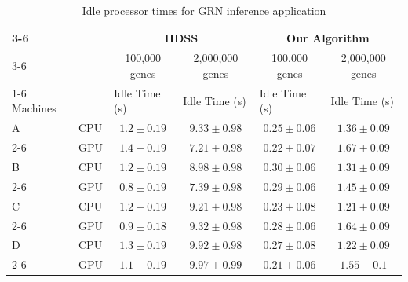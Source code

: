 \documentclass[journal]{IEEEtran}
\begin{document}
\begin{table}[htb]
\centering
\caption{Idle processor times for GRN inference application}
\begin{scriptsize}
\begin{tabular}{|l|l|l|l|l|l|}
\cline{3-6}
\multicolumn{1}{l}{} &  & \multicolumn{2}{c|}{HDSS} & \multicolumn{2}{c|}{Our Algorithm} \\ 
\cline{3-6}
\multicolumn{1}{l}{} &  & \multicolumn{1}{c|}{100,000 genes} & \multicolumn{1}{c|}{2,000,000 genes} & \multicolumn{1}{c|}{100,000 genes} & \multicolumn{1}{c|}{2,000,000 genes} \\ 
\cline{1-6}
\multicolumn{1}{|c}{} Machines &  & Idle Time (s) & Idle Time (s) & Idle Time (s) & Idle Time (s) \\ 
\hline
A & CPU & \multicolumn{1}{c|}{$1.2 \pm 0.19$} & \multicolumn{1}{c|}{$9.33 \pm 0.98$} & \multicolumn{1}{c|}{$0.25 \pm 0.06$} & \multicolumn{1}{c|}{$1.36 \pm 0.09$} \\ 
\cline{2-6}
 & GPU & \multicolumn{1}{c|}{$1.4 \pm 0.19$} & \multicolumn{1}{c|}{$7.21 \pm 0.98$} & \multicolumn{1}{c|}{$0.22 \pm 0.07$} & \multicolumn{1}{c|}{$1.67 \pm 0.09$} \\ 
\hline
B & CPU & \multicolumn{1}{c|}{$1.2 \pm 0.19$} & \multicolumn{1}{c|}{$8.98 \pm 0.98$} & \multicolumn{1}{c|}{$0.30 \pm 0.06$} & \multicolumn{1}{c|}{$1.31 \pm 0.09$} \\ 
\cline{2-6}
 & GPU & \multicolumn{1}{c|}{$0.8 \pm 0.19$} & \multicolumn{1}{c|}{$7.39 \pm 0.98$} & \multicolumn{1}{c|}{$0.29 \pm 0.06$} & \multicolumn{1}{c|}{$1.45 \pm 0.09$} \\ 
\hline
C & CPU & \multicolumn{1}{c|}{$1.2 \pm 0.19$} & \multicolumn{1}{c|}{$9.21 \pm 0.98$} & \multicolumn{1}{c|}{$0.23 \pm 0.08$} & \multicolumn{1}{c|}{$1.21 \pm 0.09$} \\ 
\cline{2-6}
 & GPU & \multicolumn{1}{c|}{$0.9 \pm 0.18$} & \multicolumn{1}{c|}{$9.32 \pm 0.98$} & \multicolumn{1}{c|}{$0.28 \pm 0.06$} & \multicolumn{1}{c|}{$1.64 \pm 0.09$} \\ 
\hline
D & CPU & \multicolumn{1}{c|}{$1.3 \pm 0.19$} & \multicolumn{1}{c|}{$9.92 \pm 0.98$} & \multicolumn{1}{c|}{$0.27 \pm 0.08$} & \multicolumn{1}{c|}{$1.22 \pm 0.09$} \\ 
\cline{2-6}
 & GPU & \multicolumn{1}{c|}{$1.1 \pm 0.19$} & \multicolumn{1}{c|}{$9.97 \pm 0.99$} & \multicolumn{1}{c|}{$0.21 \pm 0.06$} & \multicolumn{1}{c|}{$1.55 \pm 0.1$} \\ 
\hline
\end{tabular}
\end{scriptsize}
\label{table: ociosidadeGene}
\end{table}
\end{document}
